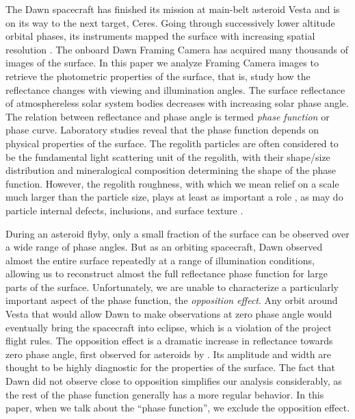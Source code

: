 \documentclass[3p,authoryear]{elsarticle}
\begin{document}
The Dawn spacecraft has finished its mission at main-belt asteroid Vesta and is on its way to the next target, Ceres. Going through successively lower altitude orbital phases, its instruments mapped the surface with increasing spatial resolution \citep{R07,R12}. The onboard Dawn Framing Camera \citep{Si11} has acquired many thousands of images of the surface. In this paper we analyze Framing Camera images to retrieve the photometric properties of the surface, that is, study how the reflectance changes with viewing and illumination angles. The surface reflectance of atmosphereless solar system bodies decreases with increasing solar phase angle. The relation between reflectance and phase angle is termed {\it phase function} or phase curve. Laboratory studies reveal that the phase function depends on physical properties of the surface. The regolith particles are often considered to be the fundamental light scattering unit of the regolith, with their shape/size distribution and mineralogical composition determining the shape of the phase function. However, the regolith roughness, with which we mean relief on a scale much larger than the particle size, plays at least as important a role \citep{C90,S07,SH11}, as may do particle internal defects, inclusions, and surface texture \citep{P04,BP12}.

During an asteroid flyby, only a small fraction of the surface can be observed over a wide range of phase angles. But as an orbiting spacecraft, Dawn observed almost the entire surface repeatedly at a range of illumination conditions, allowing us to reconstruct almost the full reflectance phase function for large parts of the surface. Unfortunately, we are unable to characterize a particularly important aspect of the phase function, the {\it opposition effect}. Any orbit around Vesta that would allow Dawn to make observations at zero phase angle would eventually bring the spacecraft into eclipse, which is a violation of the project flight rules. The opposition effect is a dramatic increase in reflectance towards zero phase angle, first observed for asteroids by \citet{G56}. Its amplitude and width are thought to be highly diagnostic for the properties of the surface. The fact that Dawn did not observe close to opposition simplifies our analysis considerably, as the rest of the phase function generally has a more regular behavior. In this paper, when we talk about the ``phase function'', we exclude the opposition effect.
\end{document}
